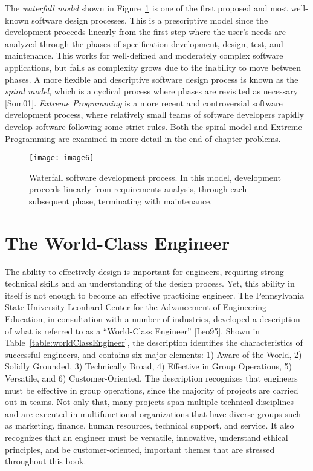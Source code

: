 The \emph{waterfall model} shown in Figure~\ref{figure:waterfallDesignProcess} 
is one of the first
proposed and most well-known software design processes. This is a
prescriptive model since the development proceeds linearly from the
first step where the user's needs are analyzed through the phases of
specification development, design, test, and maintenance. This works for
well-defined and moderately complex software applications, but fails as
complexity grows due to the inability to move between phases. A more
flexible and descriptive software design process is known as the
\emph{spiral model}, which is a cyclical process where phases are
revisited as necessary {[}Som01{]}. \emph{Extreme Programming} is a more
recent and controversial software development process, where relatively
small teams of software developers rapidly develop software following
some strict rules. Both the spiral model and Extreme Programming are
examined in more detail in the end of chapter problems.

\begin{figure}
 \texttt{[image: image6]}
\caption{Waterfall software development process. In this
model, development proceeds linearly from requirements analysis, through
each subsequent phase, terminating with maintenance.}
\label{figure:waterfallDesignProcess}
\end{figure}

\section{The World-Class Engineer}\label{the-world-class-engineer}

The ability to effectively design is important for engineers, requiring
strong technical skills and an understanding of the design process. Yet,
this ability in itself is not enough to become an effective practicing
engineer. The Pennsylvania State University Leonhard Center for the
Advancement of Engineering Education, in consultation with a number of
industries, developed a description of what is referred to as a
``World-Class Engineer'' {[}Leo95{]}. Shown in Table~\ref{table:worldClassEngineer},
 the description identifies the characteristics of successful engineers, and
contains six major elements: 1) Aware of the World, 2) Solidly Grounded,
3) Technically Broad, 4) Effective in Group Operations, 5) Versatile,
and 6) Customer-Oriented. The description recognizes that engineers must
be effective in group operations, since the majority of projects are
carried out in teams. Not only that, many projects span multiple
technical disciplines and are executed in multifunctional organizations
that have diverse groups such as marketing, finance, human resources,
technical support, and service. It also recognizes that an engineer must
be versatile, innovative, understand ethical principles, and be
customer-oriented, important themes that are stressed throughout this
book.

